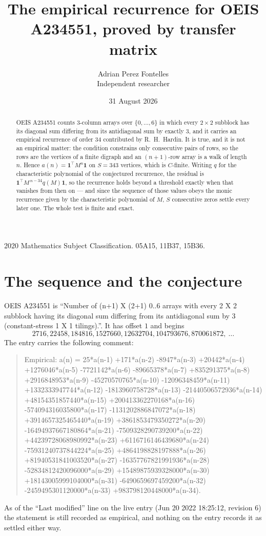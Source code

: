 \documentclass[11pt,a4paper]{article}
\title{The empirical recurrence for OEIS A234551, proved by transfer matrix}
\author{Adrian Perez Fontelles\\ \small Independent researcher}
\date{31 August 2026}
\theoremstyle{plain}
\theoremstyle{definition}
\begin{document}
\maketitle

\begin{abstract}
OEIS A234551 counts $3$-column arrays over $\{0,\dots,6\}$ in which every
$2\times2$ subblock has its diagonal sum differing from its antidiagonal sum by
exactly $3$, and it
carries an empirical recurrence of order $34$ contributed by R.~H.~Hardin. It is true,
and it is not an empirical matter: the condition constrains only consecutive pairs of rows,
so the rows are the vertices of a finite digraph and an $(n+1)$-row array is a walk of
length $n$. Hence $a(n)=\mathbf{1}^{\!\top}M^{n}\mathbf{1}$ on $S=343$ vertices, which
is $C$-finite. Writing $q$ for the characteristic polynomial of the conjectured recurrence,
the residual is $\mathbf{1}^{\!\top}M^{\,n-34}q(M)\mathbf{1}$, so the recurrence
holds beyond a threshold exactly when that vanishes from then on --- and since the sequence
of those values obeys the monic recurrence given by the characteristic polynomial of $M$,
$S$ consecutive zeros settle every later one. The whole test is finite and exact.
\end{abstract}

\noindent\small 2020 Mathematics Subject Classification. 05A15, 11B37, 15B36.\normalsize

\section{The sequence and the conjecture}

OEIS A234551 is ``Number of (n+1) X (2+1) 0..6 arrays with every 2 X 2 subblock having its diagonal sum differing from its antidiagonal sum by 3 (constant-stress 1 X 1 tilings).''. It has offset
$1$ and begins
\[
2716, 22458, 184816, 1527660, 12632704, 104793676, 870061872,\ \dots
\]
The entry carries the following comment:
\begin{quote}\small
Empirical: a(n) = 25*a(n-1) +171*a(n-2) -8947*a(n-3) +20442*a(n-4) +1276046*a(n-5) -7721142*a(n-6) -89665378*a(n-7) +835291375*a(n-8) +2916848953*a(n-9) -45270570765*a(n-10) -12096348459*a(n-11) +1332333947744*a(n-12) -1813960758728*a(n-13) -21440506572936*a(n-14) +48154351857440*a(n-15) +200413362270168*a(n-16) -574094316035800*a(n-17) -1131202886847072*a(n-18) +3914657325465440*a(n-19) +3861853479350272*a(n-20) -16494937667180864*a(n-21) -7509328290739200*a(n-22) +44239728068980992*a(n-23) +6116716146439680*a(n-24) -75931240737844224*a(n-25) +4864198828197888*a(n-26) +81940531841003520*a(n-27) -16357767821991936*a(n-28) -52834812420096000*a(n-29) +15489875939328000*a(n-30) +18143005999104000*a(n-31) -6490659697459200*a(n-32) -2459495301120000*a(n-33) +983798120448000*a(n-34).
\end{quote}
As of the ``Last modified'' line on the live entry (Jun 20 2022 18:25:12, revision 6) the statement is
still recorded as empirical, and nothing on the entry records it as settled either way.
\end{document}
